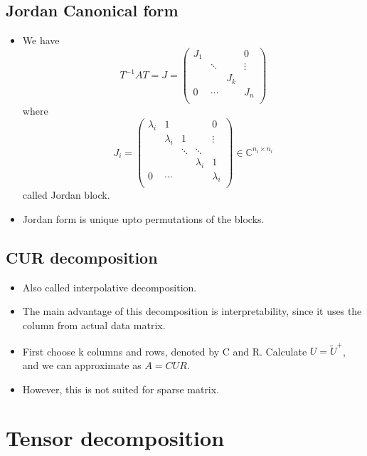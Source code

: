 \documentclass[11pt,reqno]{amsart}
\theoremstyle{remark}
\begin{document}
\subsection{Jordan Canonical form}
\begin{itemize}
\item We have 
\[
T^{-1}AT=J=
\begin{pmatrix}
  J_1 & & & 0 \\
  & \ddots & & \vdots \\
  & & J_k & \\
  0 & \cdots & & J_n \\
\end{pmatrix}
\] where
\[
J_i = 
\begin{pmatrix}
  \lambda_i & 1 & & & 0 \\
  & \lambda_i & 1 & & \vdots \\
  & & \ddots & \ddots & \\
  & & & \lambda_i & 1 \\
  0 & \cdots & & & \lambda_i \\
\end{pmatrix}
\in \mathbb{C}^{n_i\times n_i}
\]
 called Jordan block.
\item Jordan form is unique upto permutations of the blocks.
\end{itemize}
\subsection{CUR decomposition}
\begin{itemize}
\item Also called interpolative decomposition.
\item The main advantage of this decomposition is interpretability, since it uses the column
 from actual data matrix.
\item First choose k columns and rows, denoted by C and R. Calculate $U=\tilde U^+$, and we can approximate as $A=CUR$.
\item However, this is not suited for sparse matrix.

\end{itemize}

\section{Tensor decomposition}
\end{document}
